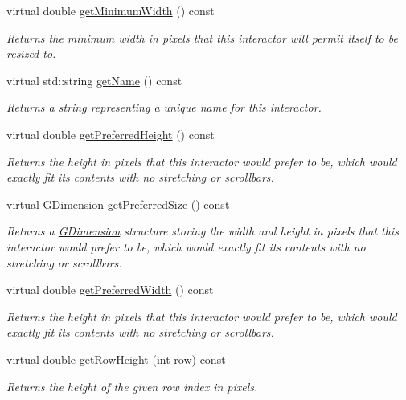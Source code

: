 \begin{DoxyCompactItemize}
virtual double \mbox{\hyperlink{classGInteractor_a59e668114fe3d49d2a0f28deb258f7c8}{get\+Minimum\+Width}} () const
\begin{DoxyCompactList}\small\item\em Returns the minimum width in pixels that this interactor will permit itself to be resized to. \end{DoxyCompactList}\item 
virtual std\+::string \mbox{\hyperlink{classGInteractor_a8a60438a5b55d0b2ceb35c8674b9d8c5}{get\+Name}} () const
\begin{DoxyCompactList}\small\item\em Returns a string representing a unique name for this interactor. \end{DoxyCompactList}\item 
virtual double \mbox{\hyperlink{classGInteractor_a747de0961653847bdc6615dbf756d715}{get\+Preferred\+Height}} () const
\begin{DoxyCompactList}\small\item\em Returns the height in pixels that this interactor would prefer to be, which would exactly fit its contents with no stretching or scrollbars. \end{DoxyCompactList}\item 
virtual \mbox{\hyperlink{structGDimension}{G\+Dimension}} \mbox{\hyperlink{classGInteractor_a4aabbee761d8e9116275401131b7ccd1}{get\+Preferred\+Size}} () const
\begin{DoxyCompactList}\small\item\em Returns a \mbox{\hyperlink{structGDimension}{G\+Dimension}} structure storing the width and height in pixels that this interactor would prefer to be, which would exactly fit its contents with no stretching or scrollbars. \end{DoxyCompactList}\item 
virtual double \mbox{\hyperlink{classGInteractor_a82bca31d37700fb0e35d2743352efd5e}{get\+Preferred\+Width}} () const
\begin{DoxyCompactList}\small\item\em Returns the height in pixels that this interactor would prefer to be, which would exactly fit its contents with no stretching or scrollbars. \end{DoxyCompactList}\item 
virtual double \mbox{\hyperlink{classGTable_a0215a742506665475b721ed12913808b}{get\+Row\+Height}} (int row) const
\begin{DoxyCompactList}\small\item\em Returns the height of the given row index in pixels. \end{DoxyCompactList}\item 

\end{DoxyCompactItemize}
